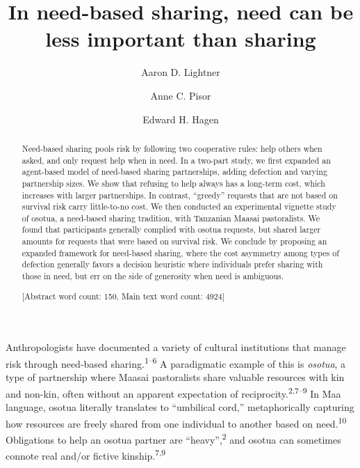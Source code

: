 \documentclass[
]{article}
\title{In need-based sharing, need can be less important than sharing}
\author[a,b]{Aaron D. Lightner}
\author[b]{Anne C. Pisor}
\author[b]{Edward H. Hagen}
\affil[a]{\textit{Department of the Study of Religion\\Aarhus University, DK}}
\affil[b]{\textit{Department of Anthropology\\Washington State University, USA}}
\date{}
\begin{document}
\maketitle
\begin{abstract}
Need-based sharing pools risk by following two cooperative rules: help others when asked, and only request help when in need. In a two-part study, we first expanded an agent-based model of need-based sharing partnerships, adding defection and varying partnership sizes. We show that refusing to help always has a long-term cost, which increases with larger partnerships. In contrast, ``greedy'' requests that are not based on survival risk carry little-to-no cost. We then conducted an experimental vignette study of osotua, a need-based sharing tradition, with Tanzanian Maasai pastoralists. We found that participants generally complied with osotua requests, but shared larger amounts for requests that were based on survival risk. We conclude by proposing an expanded framework for need-based sharing, where the cost asymmetry among types of defection generally favors a decision heuristic where individuals prefer sharing with those in need, but err on the side of generosity when need is ambiguous.

{[}Abstract word count: 150, Main text word count: 4924{]}
\end{abstract}

Anthropologists have documented a variety of cultural institutions that manage risk through need-based sharing.\textsuperscript{1--6} A paradigmatic example of this is \emph{osotua}, a type of partnership where Maasai pastoralists share valuable resources with kin and non-kin, often without an apparent expectation of reciprocity.\textsuperscript{2,7--9} In Maa language, osotua literally translates to ``umbilical cord,'' metaphorically capturing how resources are freely shared from one individual to another based on need.\textsuperscript{10} Obligations to help an osotua partner are ``heavy'',\textsuperscript{2} and osotua can sometimes connote real and/or fictive kinship.\textsuperscript{7,9}
\end{document}
